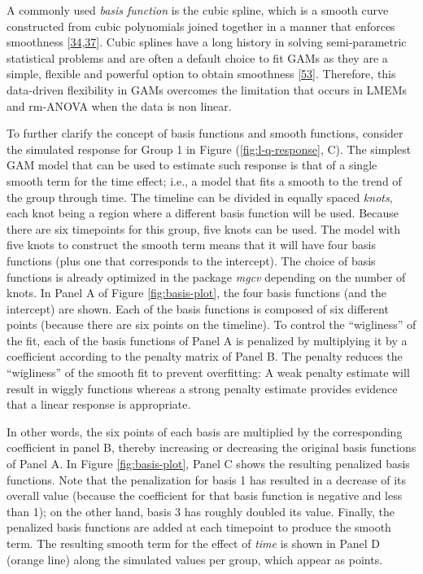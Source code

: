 \documentclass[
]{article}
\begin{document}
A commonly used \emph{basis function} is the cubic spline, which is a smooth curve constructed from cubic polynomials joined together in a manner that enforces smoothness {[}\protect\hyperlink{ref-simpson2018}{34},\protect\hyperlink{ref-wood2017}{37}{]}. Cubic splines have a long history in solving semi-parametric statistical problems and are often a default choice to fit GAMs as they are a simple, flexible and powerful option to obtain smoothness {[}\protect\hyperlink{ref-wegman1983}{53}{]}. Therefore, this data-driven flexibility in GAMs overcomes the limitation that occurs in LMEMs and rm-ANOVA when the data is non linear.

To further clarify the concept of basis functions and smooth functions, consider the simulated response for Group 1 in Figure (\ref{fig:l-q-response}, C). The simplest GAM model that can be used to estimate such response is that of a single smooth term for the time effect; i.e., a model that fits a smooth to the trend of the group through time. The timeline can be divided in equally spaced \emph{knots}, each knot being a region where a different basis function will be used. Because there are six timepoints for this group, five knots can be used. The model with five knots to construct the smooth term means that it will have four basis functions (plus one that corresponds to the intercept). The choice of basis functions is already optimized in the package \emph{mgcv} depending on the number of knots. In Panel A of Figure \ref{fig:basis-plot}, the four basis functions (and the intercept) are shown. Each of the basis functions is composed of six different points (because there are six points on the timeline). To control the ``wigliness'' of the fit, each of the basis functions of Panel A is penalized by multiplying it by a coefficient according to the penalty matrix of Panel B. The penalty reduces the ``wigliness'' of the smooth fit to prevent overfitting: A weak penalty estimate will result in wiggly functions whereas a strong penalty estimate provides evidence that a linear response is appropriate.

In other words, the six points of each basis are multiplied by the corresponding coefficient in panel B, thereby increasing or decreasing the original basis functions of Panel A. In Figure \ref{fig:basis-plot}, Panel C shows the resulting penalized basis functions. Note that the penalization for basis 1 has resulted in a decrease of its overall value (because the coefficient for that basis function is negative and less than 1); on the other hand, basis 3 has roughly doubled its value. Finally, the penalized basis functions are added at each timepoint to produce the smooth term. The resulting smooth term for the effect of \emph{time} is shown in Panel D (orange line) along the simulated values per group, which appear as points.
\end{document}
